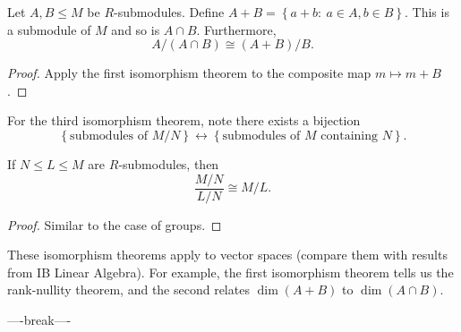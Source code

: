\documentclass[egregdoesnotlikesansseriftitles,a4paper]{scrartcl}
\begin{document}
\begin{theorem}
       Let $A,B \leq M$ be $R$-submodules. Define $A+B=\left\{a+b: \ a \in A, b \in B\right\}$. This is a submodule of $M$ and so is $A \cap B$. Furthermore, \[
       A/(A \cap B)\cong (A+B)/B
       .\] \begin{proof}
              Apply the first isomorphism theorem to the composite map $m \mapsto  m+B$.
       \end{proof}
\end{theorem}
\begin{remark}
      For the third isomorphism theorem, note there exists a bijection \[
      \left\{\text{submodules of } M/N\right\} \leftrightarrow \left\{\text{submodules of  } M \text{ containing } N\right\}
      .\] 
\end{remark}
\begin{theorem}
       If $N \leq L \leq M$ are $R$-submodules, then \[
       \frac{M/N}{L/N} \cong M/L
       .\] 
       \begin{proof}
              Similar to the case of groups.
       \end{proof}
\end{theorem}
\begin{remark}
       These isomorphism theorems apply to vector spaces (compare them with results from IB Linear Algebra). For example, the first isomorphism theorem tells us the rank-nullity theorem, and the second relates $\operatorname{dim}(A+B)$ to $\operatorname{dim}(A\cap B)$.
\end{remark}
----break----
\end{document}
